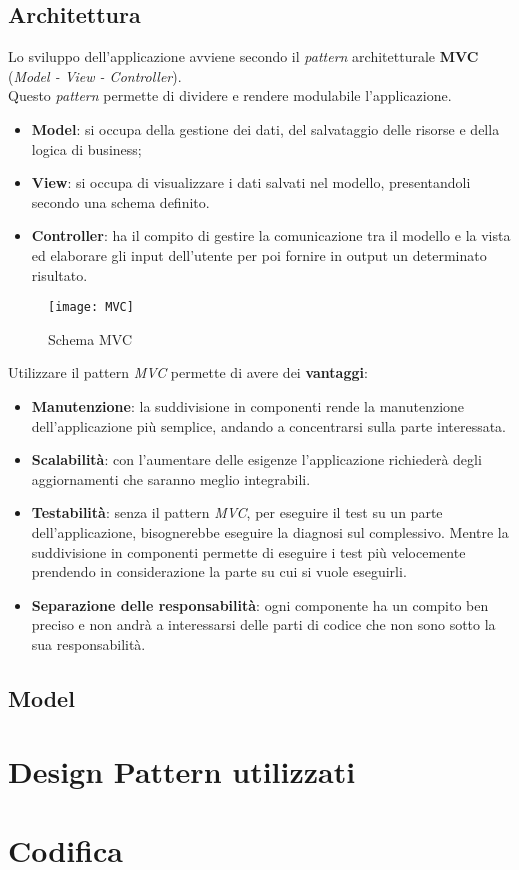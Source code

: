 \newpage
\subsection{Architettura}
Lo sviluppo dell'applicazione avviene secondo il \textit{pattern} architetturale \textbf{MVC \glsfirstoccur} (\textit{Model - View - Controller}). \\
Questo \textit{pattern} permette di dividere e rendere modulabile l'applicazione.
\begin{itemize}
\item \textbf{Model}: si occupa della gestione dei dati, del salvataggio delle risorse e della logica di business;
\item \textbf{View}: si occupa di visualizzare i dati salvati nel modello, presentandoli secondo una schema definito.
\item \textbf{Controller}: ha il compito di gestire la comunicazione tra il modello e la vista ed elaborare gli input dell'utente per poi fornire in output un determinato risultato.
\end{itemize}

\begin{figure}[H]
    \centering 
    \texttt{[image: MVC]} 
    \bigskip
    \caption{Schema MVC}
\end{figure}

\noindent
Utilizzare il pattern \textit{MVC} permette di avere dei \textbf{vantaggi}:
\begin{itemize}
\item \textbf{Manutenzione}: la suddivisione in componenti rende la manutenzione dell'applicazione più semplice, andando a concentrarsi sulla parte interessata.  
\item \textbf{Scalabilità}: con l'aumentare delle esigenze l'applicazione richiederà degli aggiornamenti che saranno meglio integrabili.
\item \textbf{Testabilità}: senza il pattern \textit{MVC}, per eseguire il test su un parte dell'applicazione, bisognerebbe eseguire la diagnosi sul complessivo. Mentre la suddivisione in componenti permette di eseguire i test più velocemente prendendo in considerazione la parte su cui si vuole eseguirli.
\item \textbf{Separazione delle responsabilità}: ogni componente ha un compito ben preciso e non andrà a interessarsi delle parti di codice che non sono sotto la sua responsabilità.
\end{itemize}

\subsection*{Model}


\section{Design Pattern utilizzati}

\section{Codifica}

